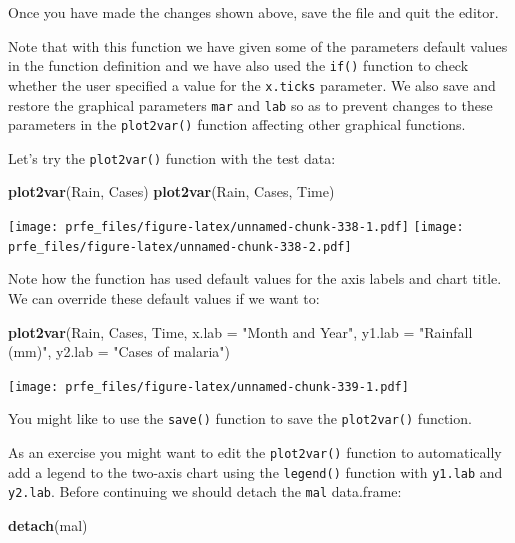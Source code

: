 \documentclass[12pt,]{book}
\newenvironment{Shaded}{\begin{snugshade}}{\end{snugshade}}
\newcommand{\KeywordTok}[1]{\textcolor[rgb]{0.13,0.29,0.53}{\textbf{#1}}}
\newcommand{\DataTypeTok}[1]{\textcolor[rgb]{0.13,0.29,0.53}{#1}}
\newcommand{\StringTok}[1]{\textcolor[rgb]{0.31,0.60,0.02}{#1}}
\newcommand{\NormalTok}[1]{#1}
\theoremstyle{definition}
\theoremstyle{definition}
\theoremstyle{definition}
\theoremstyle{remark}
\begin{document}
Once you have made the changes shown above, save the file and quit the
editor.

Note that with this function we have given some of the parameters
default values in the function definition and we have also used the
\texttt{if()} function to check whether the user specified a value for
the \texttt{x.ticks} parameter. We also save and restore the graphical
parameters \texttt{mar} and \texttt{lab} so as to prevent changes to
these parameters in the \texttt{plot2var()} function affecting other
graphical functions.

Let's try the \texttt{plot2var()} function with the test data:

\begin{Shaded}
\begin{Highlighting}[]
\KeywordTok{plot2var}\NormalTok{(Rain, Cases)}
\KeywordTok{plot2var}\NormalTok{(Rain, Cases, Time)}
\end{Highlighting}
\end{Shaded}

\texttt{[image: prfe\_files/figure-latex/unnamed-chunk-338-1.pdf]}
\texttt{[image: prfe\_files/figure-latex/unnamed-chunk-338-2.pdf]}

Note how the function has used default values for the axis labels and
chart title. We can override these default values if we want to:

\begin{Shaded}
\begin{Highlighting}[]
\KeywordTok{plot2var}\NormalTok{(Rain, Cases, Time, }\DataTypeTok{x.lab =} \StringTok{"Month and Year"}\NormalTok{,}
         \DataTypeTok{y1.lab =} \StringTok{"Rainfall (mm)"}\NormalTok{, }\DataTypeTok{y2.lab =} \StringTok{"Cases of malaria"}\NormalTok{)}
\end{Highlighting}
\end{Shaded}

\texttt{[image: prfe\_files/figure-latex/unnamed-chunk-339-1.pdf]}

You might like to use the \texttt{save()} function to save the
\texttt{plot2var()} function.

As an exercise you might want to edit the \texttt{plot2var()} function
to automatically add a legend to the two-axis chart using the
\texttt{legend()} function with \texttt{y1.lab} and \texttt{y2.lab}.
Before continuing we should detach the \texttt{mal} data.frame:

\begin{Shaded}
\begin{Highlighting}[]
\KeywordTok{detach}\NormalTok{(mal)}
\end{Highlighting}
\end{Shaded}
\end{document}
